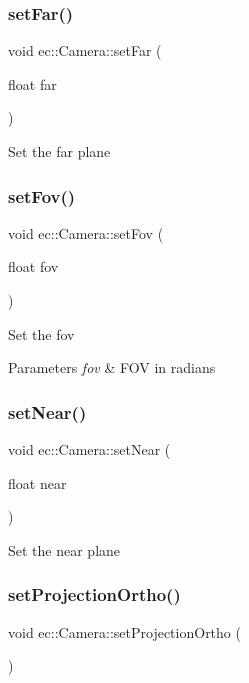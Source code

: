 \subsubsection{\texorpdfstring{set\+Far()}{setFar()}}
{\footnotesize\ttfamily void ec\+::\+Camera\+::set\+Far (\begin{DoxyParamCaption}\item[{float}]{far }\end{DoxyParamCaption})}

Set the far plane \mbox{\label{classec_1_1_camera_a1003feebe7df69a508f684c1c67f1388}} 
\subsubsection{\texorpdfstring{set\+Fov()}{setFov()}}
{\footnotesize\ttfamily void ec\+::\+Camera\+::set\+Fov (\begin{DoxyParamCaption}\item[{float}]{fov }\end{DoxyParamCaption})}

Set the fov 
\begin{DoxyParams}{Parameters}
{\em fov} & F\+OV in radians \\
\hline
\end{DoxyParams}
\mbox{\label{classec_1_1_camera_af0c1f82f4cb2aeb3908b858093080556}} 
\subsubsection{\texorpdfstring{set\+Near()}{setNear()}}
{\footnotesize\ttfamily void ec\+::\+Camera\+::set\+Near (\begin{DoxyParamCaption}\item[{float}]{near }\end{DoxyParamCaption})}

Set the near plane \mbox{\label{classec_1_1_camera_ae36280401efe1d0f5bef9997952f8814}} 
\subsubsection{\texorpdfstring{set\+Projection\+Ortho()}{setProjectionOrtho()}}
{\footnotesize\ttfamily void ec\+::\+Camera\+::set\+Projection\+Ortho (\begin{DoxyParamCaption}{ }\end{DoxyParamCaption})}

